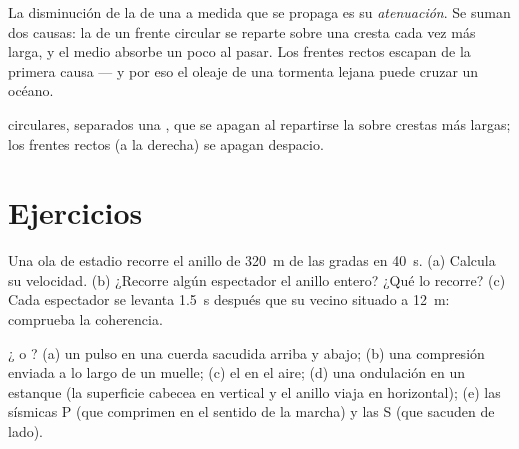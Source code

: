 \begin{definition}[Atenuación]\label{def:g12:mechanical-waves:attenuation}
La disminución de la  de una  a medida que se propaga es su
\emph{atenuación}. Se suman dos causas: la  de
un frente circular se reparte sobre una cresta cada vez más larga, y el
medio absorbe un poco al pasar. Los frentes rectos escapan de la primera
causa --- y por eso el oleaje de una tormenta lejana puede cruzar un
océano.
\end{definition}

\begin{omfigure}

{\small {} circulares, separados una , que
se apagan al repartirse la  sobre crestas más largas; los frentes
rectos (a la derecha) se apagan despacio.}
\end{omfigure}

\section{Ejercicios}

\begin{exercise}[$\star$]\label{exo:g12:mechanical-waves:1}
Una ola de estadio recorre el anillo de \qty{320}{m} de las gradas en
\qty{40}{s}. (a) Calcula su velocidad. (b) ¿Recorre algún espectador el
anillo entero? ¿Qué lo recorre? (c) Cada espectador se levanta
\qty{1.5}{s} después que su vecino situado a \qty{12}{m}: comprueba la
coherencia.
\end{exercise}

\begin{exercise}[$\star$]\label{exo:g12:mechanical-waves:2}
¿ o ? (a) un pulso en una cuerda sacudida arriba
y abajo; (b) una compresión enviada a lo largo de un muelle; (c) el
 en el aire; (d) una ondulación en un estanque (la superficie
cabecea en vertical y el anillo viaja en horizontal); (e) las 
sísmicas P (que comprimen en el sentido de la marcha) y las S (que
sacuden de lado).
\end{exercise}

